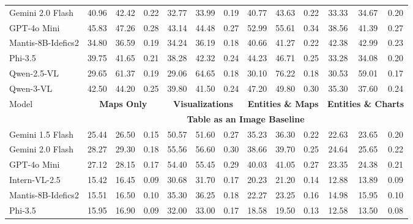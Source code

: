 \documentclass[11pt]{article}
\begin{document}
\begin{table}[t]
\begin{tabular}{lccc|ccc|ccc|ccc}
 Gemini 2.0 Flash     & 40.96 & 42.42 & 0.22 & 32.77 & 33.99 & 0.19 & 40.77 & 43.63 & 0.22 & 33.33 & 34.67 & 0.20 \\
 GPT-4o Mini          & \cellcolor{yellow}45.83 & 47.26 & \cellcolor{yellow}0.28 & \cellcolor{yellow}43.14 & 44.48 & \cellcolor{yellow}0.27 & \cellcolor{yellow}52.99 & 55.61 & \cellcolor{yellow}0.34 & \cellcolor{yellow}38.56 & 41.39 & \cellcolor{yellow}0.27 \\
 Mantis-8B-Idefics2   & 34.80 & 36.59 & 0.19 & 34.24 & 36.19 & 0.18 & 40.66 & 41.27 & 0.22 & 42.38 & 42.99 & 0.23 \\
 Phi-3.5              & 39.75 & 41.65 & 0.21 & 38.28 & 42.32 & 0.24 & 44.23 & 46.71 & 0.25 & 33.28 & 34.08 & 0.20 \\
 Qwen-2.5-VL          & 29.65 & \cellcolor{yellow}61.37 & 0.19 & 29.06 & \cellcolor{yellow}64.65 & 0.18 & 30.10 & \cellcolor{yellow}76.22 & 0.18 & 30.53 & \cellcolor{yellow}59.01 & 0.17 \\
 Qwen-3-VL            & 42.50 & 44.20 & 0.25 & 39.80 & 41.50 & 0.24 & 47.20 & 49.80 & 0.30 & 35.30 & 37.60 & 0.24 \\
\midrule
 Model & \multicolumn{3}{c|}{\textbf{Maps Only}} & \multicolumn{3}{c|}{\textbf{Visualizations}} & \multicolumn{3}{c|}{\textbf{Entities \& Maps}} & \multicolumn{3}{c}{\textbf{Entities \& Charts}} \\
\cmidrule{2-13}
& \multicolumn{12}{c}{\textbf{Table as an Image Baseline}} \\
\cmidrule{1-13}
 Gemini 1.5 Flash     & 25.44 & 26.50 & 0.15 & 50.57 & 51.60 & 0.27 & 35.23 & 36.30 & 0.22 & 22.63 & 23.65 & 0.20 \\
 Gemini 2.0 Flash     & \cellcolor{yellow}28.27 & \cellcolor{yellow}29.30 & \cellcolor{yellow}0.18 & \cellcolor{yellow}55.56 & \cellcolor{yellow}56.60 & \cellcolor{yellow}0.30 & 38.66 & 39.70 & 0.25 & \cellcolor{yellow}24.64 & \cellcolor{yellow}25.65 & \cellcolor{yellow}0.22 \\
 GPT-4o Mini          & 27.12 & 28.15 & 0.17 & 54.40 & 55.45 & 0.29 & \cellcolor{yellow}40.03 & \cellcolor{yellow}41.05 & \cellcolor{yellow}0.27 & 23.35 & 24.38 & 0.21 \\
 Intern-VL-2.5        & 15.42 & 16.45 & 0.09 & 30.68 & 31.70 & 0.17 & 20.23 & 21.20 & 0.14 & 12.88 & 13.89 & 0.09 \\
 Mantis-8B-Idefics2   & 15.51 & 16.50 & 0.10 & 35.30 & 36.25 & 0.18 & 22.27 & 23.25 & 0.16 & 14.98 & 15.95 & 0.10 \\
 Phi-3.5              & 15.95 & 16.90 & 0.09 & 32.00 & 33.00 & 0.17 & 18.58 & 19.50 & 0.13 & 12.58 & 13.50 & 0.08 \\

\end{tabular}
\end{table}
\end{document}
